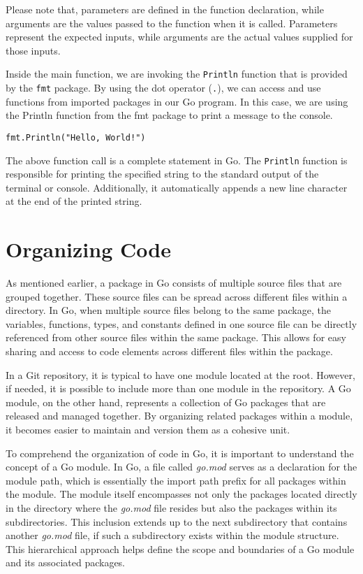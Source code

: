Please note that, parameters are defined in the function declaration, while
arguments are the values passed to the function when it is called. Parameters
represent the expected inputs, while arguments are the actual values supplied
for those inputs.

Inside the main function, we are invoking the \texttt{Println} function that is
provided by the \texttt{fmt} package. By using the dot operator (\texttt{.}), we
can access and use functions from imported packages in our Go program. In this
case, we are using the Println function from the fmt package to print a message
to the console.

\begin{lstlisting}[numbers=none]
fmt.Println("Hello, World!")
\end{lstlisting}

The above function call is a complete statement in Go. The \texttt{Println}
function is responsible for printing the specified string to the standard output
of the terminal or console. Additionally, it automatically appends a new line
character at the end of the printed string.

\section{Organizing Code}

As mentioned earlier, a package in Go consists of multiple source files that are
grouped together. These source files can be spread across different files within
a directory. In Go, when multiple source files belong to the same package, the
variables, functions, types, and constants defined in one source file can be
directly referenced from other source files within the same package. This allows
for easy sharing and access to code elements across different files within the
package.

In a Git repository, it is typical to have one module located at the root.
However, if needed, it is possible to include more than one module in the
repository. A Go module, on the other hand, represents a collection of Go
packages that are released and managed together. By organizing related packages
within a module, it becomes easier to maintain and version them as a cohesive
unit.

To comprehend the organization of code in Go, it is important to understand the
concept of a Go module. In Go, a file called \textit{go.mod} serves as a
declaration for the module path, which is essentially the import path prefix for
all packages within the module. The module itself encompasses not only the
packages located directly in the directory where the \textit{go.mod} file
resides but also the packages within its subdirectories. This inclusion extends
up to the next subdirectory that contains another \textit{go.mod} file, if such
a subdirectory exists within the module structure. This hierarchical approach
helps define the scope and boundaries of a Go module and its associated
packages.

